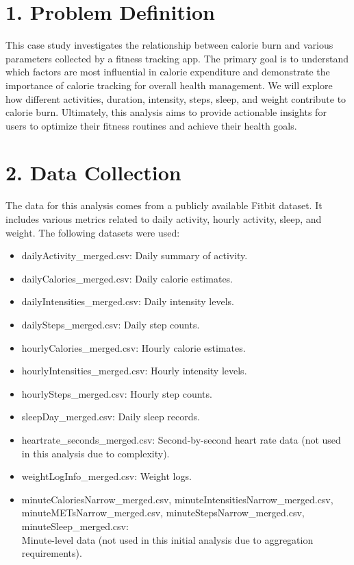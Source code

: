 \documentclass[
]{article}
\begin{document}
\section{1. Problem Definition}\label{problem-definition}

This case study investigates the relationship between calorie burn and
various parameters collected by a fitness tracking app. The primary goal
is to understand which factors are most influential in calorie
expenditure and demonstrate the importance of calorie tracking for
overall health management. We will explore how different activities,
duration, intensity, steps, sleep, and weight contribute to calorie
burn. Ultimately, this analysis aims to provide actionable insights for
users to optimize their fitness routines and achieve their health goals.

\section{2. Data Collection}\label{data-collection}

The data for this analysis comes from a publicly available Fitbit
dataset. It includes various metrics related to daily activity, hourly
activity, sleep, and weight. The following datasets were used:

\begin{itemize}
\item
  dailyActivity\_merged.csv: Daily summary of activity.
\item
  dailyCalories\_merged.csv: Daily calorie estimates.
\item
  dailyIntensities\_merged.csv: Daily intensity levels.
\item
  dailySteps\_merged.csv: Daily step counts.
\item
  hourlyCalories\_merged.csv: Hourly calorie estimates.
\item
  hourlyIntensities\_merged.csv: Hourly intensity levels.
\item
  hourlySteps\_merged.csv: Hourly step counts.
\item
  sleepDay\_merged.csv: Daily sleep records.
\item
  heartrate\_seconds\_merged.csv: Second-by-second heart rate data (not
  used in this analysis due to complexity).
\item
  weightLogInfo\_merged.csv: Weight logs.
\item
  minuteCaloriesNarrow\_merged.csv, minuteIntensitiesNarrow\_merged.csv,
  minuteMETsNarrow\_merged.csv, minuteStepsNarrow\_merged.csv,
  minuteSleep\_merged.csv:\\
  Minute-level data (not used in this initial analysis due to
  aggregation requirements).
\end{itemize}
\end{document}
